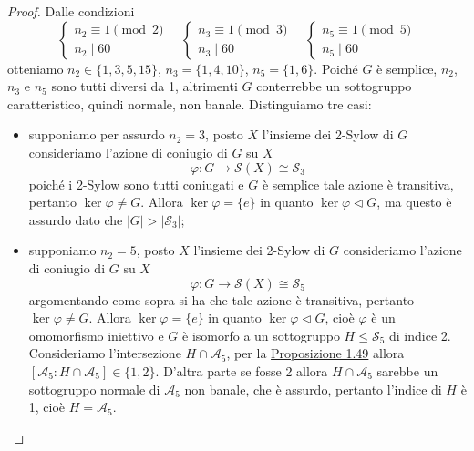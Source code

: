 \documentclass[11pt]{scrartcl}
\begin{document}
\begin{proof}
    Dalle condizioni
    \[
        \begin{cases}
            n_2 \equiv 1 \pmod 2\\
            n_2 \mid 60
        \end{cases}
        \quad
        \begin{cases}
            n_3 \equiv 1 \pmod 3\\
            n_3 \mid 60
        \end{cases}
        \quad
        \begin{cases}
            n_5 \equiv 1 \pmod 5\\
            n_5 \mid 60
        \end{cases}
    \]
    otteniamo $n_2 \in \{1, 3, 5, 15\}$, $n_3 = \{1, 4, 10\}$, $n_5 = \{1, 6\}$.
    Poiché $G$ è semplice, $n_2$, $n_3$ e $n_5$ sono tutti diversi da 1,
    altrimenti $G$ conterrebbe un sottogruppo caratteristico, quindi normale,
    non banale. Distinguiamo tre casi:
    \begin{itemize}
        \item supponiamo per assurdo $n_2 = 3$, posto $X$ l'insieme dei 2-Sylow di $G$
        consideriamo l'azione di coniugio di $G$ su $X$
        \[
            \varphi: G \longrightarrow \mathcal{S}(X) \cong \mathcal{S}_3
        \]
        poiché i 2-Sylow sono tutti coniugati e $G$ è semplice tale azione è 
        transitiva, pertanto $\ker\varphi \neq G$. Allora $\ker\varphi = \{e\}$ 
        in quanto $\ker\varphi\triangleleft G$,
        ma questo è assurdo dato che $|G| > |\mathcal{S}_3|$;
        \item supponiamo $n_2 = 5$, posto $X$ l'insieme dei 2-Sylow di $G$
        consideriamo l'azione di coniugio di $G$ su $X$
        \[
            \varphi: G \longrightarrow \mathcal{S}(X) \cong \mathcal{S}_5
        \]
        argomentando come sopra si ha che tale azione è transitiva, pertanto
        $\ker\varphi \neq G$. Allora $\ker\varphi = \{e\}$ in quanto 
        $\ker\varphi \triangleleft G$, cioè $\varphi$ è un omomorfismo iniettivo
        e $G$ è isomorfo a un sottogruppo $H\leqslant \mathcal{S}_5$ di indice 2. Consideriamo
        l'intersezione $H \cap \mathcal{A}_5$, per la \hyperref[prop1.49]{Proposizione 1.49}
        allora $[\mathcal{A}_5:H\cap\mathcal{A}_5] \in \{1, 2\}$. D'altra parte
        se fosse 2 allora $H\cap\mathcal{A}_5$ sarebbe un sottogruppo normale di $\mathcal{A}_5$
        non banale, che è assurdo, pertanto l'indice di $H$ è 1, cioè $H = \mathcal{A}_5$.

\end{itemize}
\end{proof}
\end{document}
